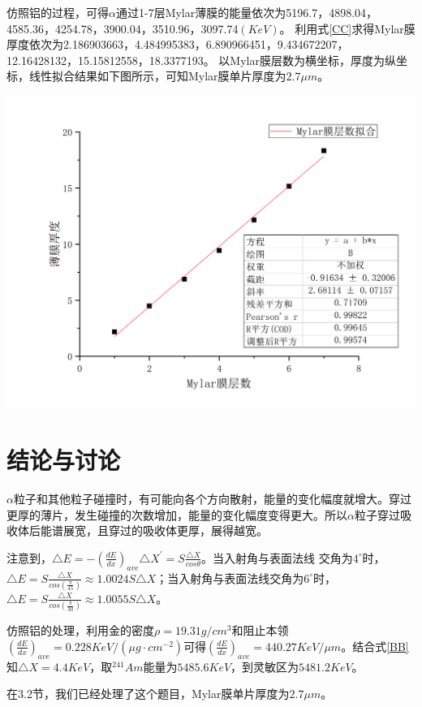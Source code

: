 \documentclass[hyperref]{ctexart}
\begin{document}
\begin{multicols}{2}
	仿照铝的过程，可得$\alpha$通过1-7层Mylar薄膜的能量依次为5196.7，4898.04，4585.36，4254.78，3900.04，3510.96，3097.74$(KeV)$。
利用式\eqref{CC}求得Mylar膜厚度依次为2.186903663，4.484995383，6.890966451，9.434672207，12.16428132，15.15812558，18.3377193。
以Mylar膜层数为横坐标，厚度为纵坐标，线性拟合结果如下图所示，可知Mylar膜单片厚度为$2.7\mu m$。
	\begin{center}\includegraphics[scale=0.3]{T4.png}\end{center}

	\section{结论与讨论}
	$\alpha$粒子和其他粒子碰撞时，有可能向各个方向散射，能量的变化幅度就增大。穿过更厚的薄片，发生碰撞的次数增加，能量的变化幅度变得更大。所以$\alpha$粒子穿过吸收体后能谱展宽，且穿过的吸收体更厚，展得越宽。

	注意到，$\triangle E=-(\frac{dE}{dx})_{ave}\triangle X ^{'}=S\frac{\triangle X}{cos \theta}$。当入射角与表面法线
交角为$4^{\circ}$时，$\triangle E=S\frac{\triangle X}{cos (\frac{\pi}{45})} \approx 1.0024S\triangle X$；当入射角与表面法线交角为$6^{\circ}$时，$\triangle E=S\frac{\triangle X}{cos (\frac{\pi}{30})} \approx 1.0055S\triangle X$。

	仿照铝的处理，利用金的密度$\rho=19.31g/cm^{3}$和阻止本领$(\frac{dE}{dx})_{ave}=0.228KeV/(\mu g \cdot cm^{-2})$可得$(\frac{dE}{dx})_{ave}=440.27KeV/\mu m$。结合式\eqref{BB}知$\triangle X=4.4KeV$，取$^{241}Am$能量为$5485.6KeV$，到灵敏区为$5481.2KeV$。

	在3.2节，我们已经处理了这个题目，Mylar膜单片厚度为$2.7\mu m$。


\end{multicols}
\end{document}
